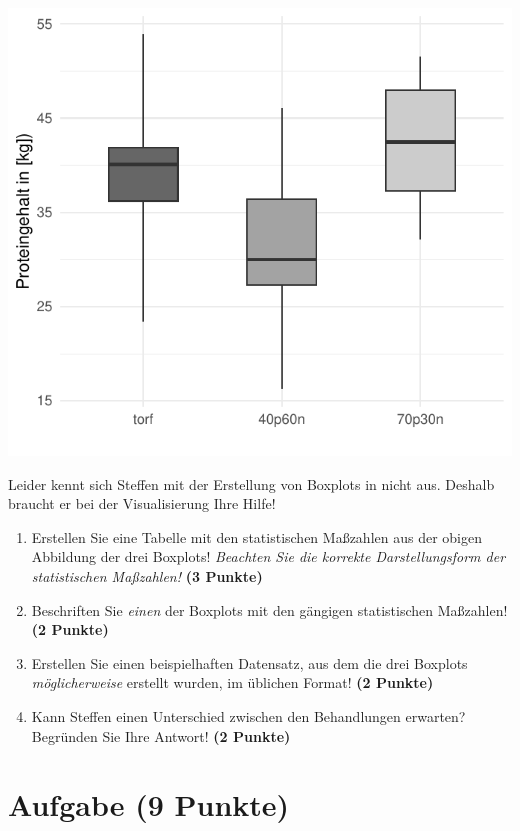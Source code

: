 \documentclass[a4paper, 9pt]{scrartcl}\usepackage[]{graphicx}\usepackage[]{xcolor}
\makeatletter
\def\maxwidth{ %
  \ifdim\Gin@nat@width>\linewidth
    \linewidth
  \else
    \Gin@nat@width
  \fi
}
\makeatother
\begin{document}
{\centering \includegraphics[width=\maxwidth]{img/boxplot-02-zer-1} 

}




Leider kennt sich Steffen mit der Erstellung von Boxplots in \Rlogo nicht aus. Deshalb braucht er bei der Visualisierung Ihre Hilfe!

\begin{enumerate}
\item Erstellen Sie eine Tabelle mit den statistischen Maßzahlen aus der obigen Abbildung der drei Boxplots! \textit{Beachten Sie die korrekte Darstellungsform der statistischen Maßzahlen!} \textbf{(3 Punkte)}
\item Beschriften Sie \textit{einen} der Boxplots mit den gängigen statistischen Maßzahlen! \textbf{(2 Punkte)}
\item Erstellen Sie einen beispielhaften Datensatz, aus dem die drei Boxplots \textit{möglicherweise} erstellt wurden, im \Rlogo üblichen Format! \textbf{(2 Punkte)}
\item Kann Steffen einen Unterschied zwischen den Behandlungen erwarten? Begründen Sie Ihre Antwort! \textbf{(2 Punkte)}
\end{enumerate} 
\clearpage

\section{Aufgabe \hfill (9 Punkte)}
\end{document}

